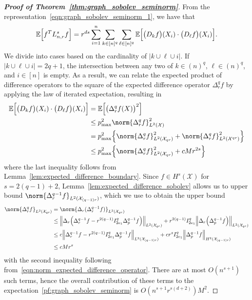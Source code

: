 \documentclass{article}
\newcommand{\abs}[1]{\left \lvert #1 \right \rvert}
\newcommand{\1}{\mathbf{1}}
\newcommand{\Lap}{L}
\newcommand{\Xset}{\mathcal{X}}
\newcommand{\Leb}{L}
\newcommand{\Ebb}{\mathbb{E}}
\theoremstyle{alden}
\theoremstyle{aldenthm}
\theoremstyle{definition}
\theoremstyle{remark}
\begin{document}
\begin{proof}[\textbf{Proof of Theorem~\ref{thm:graph_sobolev_seminorm}}]
	From the representation~\eqref{eqn:graph_sobolev_seminorm_1}, we have that 
	\begin{equation}
	\label{pf:graph_sobolev_seminorm}
	\Ebb\Bigl[f^T \Lap_{n,r}^s f\Bigr] = r^{ds}\sum_{i = 1}^{n} \sum_{k \in [n]^q} \sum_{\ell \in [n]^q} \Ebb\Bigl[\bigl(D_kf\bigr)(X_i) \cdot  \bigl(D_{\ell}f\bigr)(X_i)\Bigr].
	\end{equation}
	We divide into cases based on the cardinality of $\abs{k \cup \ell \cup i}$. If $\abs{k \cup \ell \cup i} = 2q + 1$, the intersection between any two of $k \in (n)^q$, $\ell \in (n)^q$, and $i \in [n]$ is empty. As a result, we can relate the expected product of difference operators to the square of the expected difference operator $\Delta_r^qf$ by applying the law of iterated expectation, resulting in
	\begin{align*}
	\Ebb\Bigl[\bigl(D_kf\bigr)(X_i) \cdot \bigl(D_{\ell}f\bigr)(X_i)\Bigr] & = \Ebb\Bigl[\bigl(\Delta_r^qf(X)\bigr)^2\Bigr] \\
	& \leq p_{\max}^2 \norm{\Delta_r^qf}_{\Leb^2(\Xset)}^2 \\
	& = p_{\max}^2 \Bigl\{\norm{\Delta_r^qf}_{\Leb^2(\Xset_{qr})}^2 + \norm{\Delta_r^qf}_{\Leb^2(\Xset^{qr})}^2\Bigr\} \\
	& \leq p_{\max}^2 \Bigl\{\norm{\Delta_r^qf}_{\Leb^2(\Xset_{qr})}^2 + c M r^{2s}\Bigr\} 
	\end{align*}
	where the last inequality follows from Lemma~\ref{lem:expected_difference_boundary}. Since $f \in H^{s}(\Xset)$ for $s = 2(q - 1) + 2$, Lemma~\ref{lem:expected_difference_sobolev} allows us to upper bound $\norm{\Delta_r^{q - 1}f}_{\Leb^2(\Xset_{(q - 1)r})}$, which we use to obtain the upper bound
	\begin{align}
	\norm{\Delta_r^qf}_{\Leb^2(\Xset_{qr})} & = \norm{\Delta_r(\Delta_r^{q - 1}f)}_{\Leb^2(\Xset_{qr})} \nonumber \\
	& \leq \Bigl\|\Delta_r\Bigl(\Delta_r^{q - 1}f - r^{2(q - 1)}I_{2e_1}^q\Delta_p^{q - 1}f\Bigr)\Bigr\|_{\Leb^2(\Xset_{qr})} +  r^{2(q - 1)}I_{2e_1}^q\Bigl\|\Delta_r\Bigl(\Delta_p^{q - 1}f\Bigr)\Bigr\|_{\Leb^2(\Xset_{qr})} \nonumber \\ 
	& \leq c \Bigl\|\Delta_r^{q - 1}f - r^{2(q - 1)}I_{2e_1}^q\Delta_p^{q - 1}f\Bigr\|_{\Leb^2(\Xset_{(q - 1)r})} +  c r^{s}I_{2e_1}^q\Bigl\|\Delta_p^{q - 1}f\Bigr\|_{H^2(\Xset_{(q - 1)r})} \nonumber \\
	& \leq c M r^s
	\end{align}
	with the second inequality following from~\eqref{eqn:norm_expected_difference_operator}. There are at most $O(n^{s + 1})$ such terms, hence the overall contribution of these terms to the expectation~\eqref{pf:graph_sobolev_seminorm} is $O(n^{s + 1}r^{s(d + 2)})M^2$. 
	

\end{proof}
\end{document}
